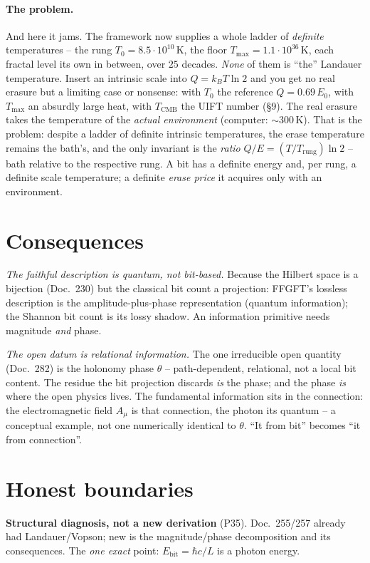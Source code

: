 \paragraph{The problem.} And here it jams. The framework now supplies a whole ladder of \emph{definite}
temperatures -- the rung $T_0=8.5\cdot10^{10}$\,K, the floor $T_{\max}=1.1\cdot10^{36}$\,K, each fractal
level its own in between, over $25$ decades. \emph{None} of them is \enquote{the} Landauer temperature.
Insert an intrinsic scale into $Q=k_B T\ln2$ and you get no real erasure but a limiting case or nonsense:
with $T_0$ the reference $Q=0.69\,E_0$, with $T_{\max}$ an absurdly large heat, with $T_\text{CMB}$ the
UIFT number (\S9). The real erasure takes the temperature of the \emph{actual environment} (computer:
$\sim300$\,K). That is the problem: despite a ladder of definite intrinsic temperatures, the erase
temperature remains the bath's, and the only invariant is the \emph{ratio}
$Q/E=(T/T_\text{rung})\ln2$ -- bath relative to the respective rung. A bit has a definite energy and, per
rung, a definite scale temperature; a definite \emph{erase price} it acquires only with an environment.

\section{Consequences}
\emph{The faithful description is quantum, not bit-based.} Because the Hilbert space is a bijection
(Doc.~230) but the classical bit count a projection: FFGFT's lossless description is the
amplitude-plus-phase representation (quantum information); the Shannon bit count is its lossy shadow. An
information primitive needs magnitude \emph{and} phase.

\emph{The open datum is relational information.} The one irreducible open quantity (Doc.~282) is the
holonomy phase $\theta$ -- path-dependent, relational, not a local bit content. The residue the bit
projection discards \emph{is} the phase; and the phase \emph{is} where the open physics lives. The
fundamental information sits in the connection: the electromagnetic field $A_\mu$ is that connection, the
photon its quantum -- a conceptual example, not one numerically identical to $\theta$. \enquote{It from
bit} becomes \enquote{it from connection}.

\section{Honest boundaries}
\textbf{Structural diagnosis, not a new derivation} (P35). Doc.~255/257 already had Landauer/Vopson; new
is the magnitude/phase decomposition and its consequences. The \emph{one exact} point:
$E_\text{bit}=\hbar c/L$ is a photon energy.

